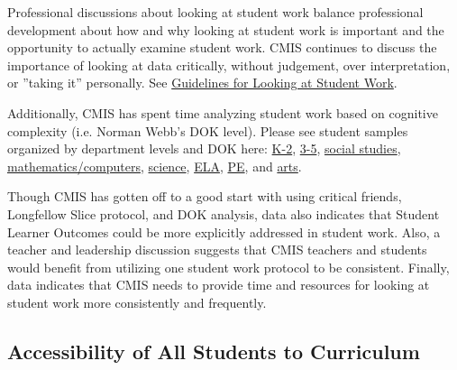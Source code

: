 \documentclass{report}
\begin{document}
\begin{findings}
Professional discussions about looking at student work  balance professional development about how and why looking at student work is important and the opportunity to actually examine student work.  CMIS continues to discuss the importance of looking at data critically, without judgement, over interpretation, or ”taking it” personally. See \href{https://docs.google.com/a/cmis.ac.th/document/d/18fMo-Cvgh0C2YHZjvZf71VkU5JehPuZDzFPQofcLUuI/edit?usp=sharing}{Guidelines for Looking at Student Work}. 

Additionally, CMIS has spent time analyzing student work based on cognitive complexity (i.e. Norman Webb’s DOK level). Please see student samples organized by department levels and DOK here: \href{https://drive.google.com/drive/folders/0ByVFfrm0zfoldHoxR0plT3dSNVE?usp=sharing}{K-2}, \href{https://drive.google.com/drive/folders/0ByVFfrm0zfolRVhuOFRoblRyVnM?usp=sharing}{3-5}, \href{https://drive.google.com/drive/folders/0ByVFfrm0zfolTnhLUU9iVVkxakU?usp=sharing}{social studies}, \href{https://drive.google.com/drive/folders/0ByVFfrm0zfolcUo4dDZYWkgwTEE?usp=sharing}{mathematics/computers}, \href{https://drive.google.com/drive/folders/0ByVFfrm0zfolb2ZYU0JBSnV2MFE?usp=sharing}{science}, \href{https://drive.google.com/drive/folders/0ByVFfrm0zfolVFVtT0luRUd0MlU?usp=sharing}{ELA}, \href{https://drive.google.com/drive/folders/0ByVFfrm0zfolV3VMR0JlNzhWSVU?usp=sharing}{PE}, and \href{https://drive.google.com/drive/folders/0ByVFfrm0zfolMTg0WFNPSzFsZnc?usp=sharing}{arts}. 


Though CMIS has gotten off to a good start with using critical friends, Longfellow Slice protocol, and DOK analysis, data also indicates that Student Learner Outcomes could be more explicitly addressed in student work. Also, a teacher and leadership discussion suggests that CMIS teachers and students would benefit from utilizing one student work protocol to be consistent. Finally, data indicates that CMIS needs to provide time and resources for  looking at student work more consistently and frequently. 
\end{findings}

\subsection{Accessibility of All Students to Curriculum}

\end{document}
